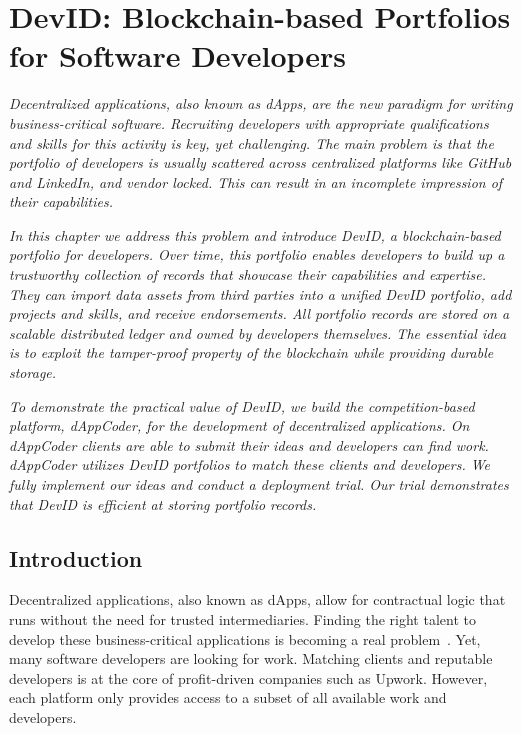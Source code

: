 \chapter{DevID: Blockchain-based Portfolios for Software Developers}
\label{chapter:devid}

\emph{Decentralized applications, also known as dApps, are the new paradigm for writing business-critical software.
Recruiting developers with appropriate qualifications and skills for this activity is key, yet challenging.
The main problem is that the portfolio of developers is usually scattered across centralized platforms like GitHub and LinkedIn, and vendor locked.
This can result in an incomplete impression of their capabilities. }

\emph{In this chapter we address this problem and introduce \emph{DevID}, a blockchain-based portfolio for developers.
Over time, this portfolio enables developers to build up a trustworthy collection of records that showcase their capabilities and expertise.
They can import data assets from third parties into a unified DevID portfolio, add projects and skills, and receive endorsements.
All portfolio records are stored on a scalable distributed ledger and owned by developers themselves.
The essential idea is to exploit the tamper-proof property of the blockchain while providing durable storage.}

\emph{To demonstrate the practical value of DevID, we build the competition-based platform, \emph{dAppCoder}, for the development of decentralized applications.
On dAppCoder clients are able to submit their ideas and developers can find work.
dAppCoder utilizes DevID portfolios to match these clients and developers.
We fully implement our ideas and conduct a deployment trial.
Our trial demonstrates that DevID is efficient at storing portfolio records. }

\newpage

\section{Introduction}
\label{sec:introduction}
Decentralized applications, also known as dApps, allow for contractual logic that runs without the need for trusted intermediaries.
Finding the right talent to develop these business-critical applications is becoming a real problem~\cite{shortage2016nasdaq}.
Yet, many software developers are looking for work.
Matching clients and reputable developers is at the core of profit-driven companies such as Upwork.
However, each platform only provides access to a subset of all available work and developers.

